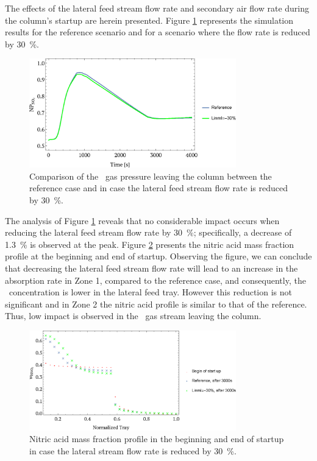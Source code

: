 \documentclass[journal=jacsat,manuscript=article]{achemso}
\newcommand{\nox}{\ce{NO_{\rmfamily{x}}}}
\newcommand{\hnotres}{\ce{HNO3}}
\begin{document}
The effects of the lateral feed stream flow rate and secondary air flow rate during the column's startup are herein presented. Figure \ref{fig:startLinl} represents the simulation results for the reference scenario and for a scenario where the flow rate is reduced by \SI{30}{\percent}.
\begin{figure}[htb]
	\centering
	\includegraphics[width=0.8\textwidth]{figure3sp.eps}
	\caption{Comparison of the \nox~gas pressure leaving the column between the reference case and in case the lateral feed stream flow rate is reduced by  \SI{30}{\percent}.} 	
	\label{fig:startLinl}
\end{figure}
The analysis of Figure \ref{fig:startLinl} reveals that no considerable impact occurs when reducing the lateral feed stream flow rate by \SI{30}{\percent}; specifically, a decrease of \SI{1.3}{\percent} is observed at the peak. Figure \ref{fig:startLinlperfil} presents the nitric acid mass fraction profile at the beginning and end of startup. Observing the figure, we can conclude that decreasing the lateral feed stream flow rate will lead to an increase in the absorption rate in Zone 1, compared to the reference case, and consequently, the \hnotres~concentration is lower in the lateral feed tray. However this reduction is not significant and in Zone 2 the nitric acid profile is similar to that of the reference. Thus, low impact is observed in the \nox~gas stream leaving the column.


\begin{figure}[htb]
	\centering
	\includegraphics[width=0.8\textwidth]{figure4sp.eps}
	\caption{Nitric acid mass fraction profile in the beginning and end of startup in case the lateral stream flow rate is reduced by \SI{30}{\percent}.} 	
	\label{fig:startLinlperfil}
\end{figure}
\end{document}
